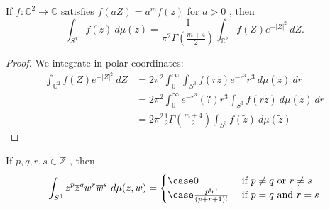 \documentclass{article}
\begin{document}
\begin{theorem}
    If $f: \mathbb{C}^{2} \rightarrow \mathbb{C}$  satisfies $f(aZ) = a^{m}f(z)$  for $a>0$ , then
    \begin{equation}
        \int_{S^{3}} f(\tilde{z}) \ d\mu(\tilde{z})
        =
        \frac{1}{\pi^{2} \Gamma(\frac{m+4}{2})} \int_{\mathbb{C}^{2}} f(Z) e^{- | Z |^{2}} \ dZ.
    \end{equation}
\end{theorem}

\begin{proof}
    We integrate in polar coordinates:
    \begin{equation}
        \begin{split}
            \int_{\mathbb{C}^{2}} f(Z) e^{-| Z |^{2}} \ dZ 
            &= 2\pi^{2} \int^{\infty}_{0} \int^{}_{S^{3}} f(r \tilde{z}) e^{-r^{3}} r^{3} \ d\mu(\tilde{z}) \ dr \\
            &= 2\pi^{2} \int^{\infty}_{0} e^{-r^{3}}(?) r^{3} \int^{}_{S^{3}} f(r \tilde{z}) \ d\mu(\tilde{z}) \ dr \\
            &= 2 \pi^{2} \frac{1}{2} \Gamma (\frac{m+4}{2}) \int_{S^{3}} f(\tilde{z}) \ d\mu(\tilde{z})
        \end{split}
    \end{equation}
\end{proof}

\begin{theorem}
    If $p,q,r,s \in \mathbb{Z}$ , then 
    \begin{equation}
        \int_{S^{3}} z^{p} \overline{z}^{q} w^{r} \overline{w}^{s} \ d\mu(z,w)
        =
        \begin{cases}
                \case 0 &\ \text{if } p \neq q \text{ or } r \neq s \\
                \case \frac{p! r!}{(p+r+1)!} &\ \text{if } p=q \text{ and } r=s \\
        \end{cases}
    \end{equation}
\end{theorem}
\end{document}
